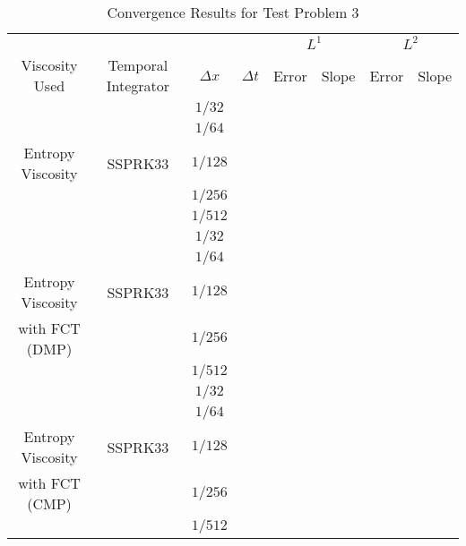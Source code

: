 \documentclass{report}
\begin{document}
\begin{table}[H]\caption{\label{prob3}Convergence Results for Test Problem 3}
\begin{center}
\begin{tabular}{c|c|c|c||c|c|c|c}\hline\hline
& & & & \multicolumn{2}{c}{$L^1$} & \multicolumn{2}{|c}{$L^2$}\\ \cline{5-8}
Viscosity Used         & Temporal Integrator & $\Delta x$ & $\Delta t$ & Error & Slope & Error & Slope \\ \hline\hline
                       &                     & $1/32$     &            &       &       &       &       \\
                       &                     & $1/64$     &            &       &       &       &       \\
Entropy Viscosity      & SSPRK33             & $1/128$    &            &       &       &       &       \\
                       &                     & $1/256$    &            &       &       &       &       \\
                       &                     & $1/512$    &            &       &       &       &       \\ \hline
                       &                     & $1/32$     &            &       &       &       &       \\
                       &                     & $1/64$     &            &       &       &       &       \\
Entropy Viscosity      & SSPRK33             & $1/128$    &            &       &       &       &       \\
with FCT (DMP)         &                     & $1/256$    &            &       &       &       &       \\
                       &                     & $1/512$    &            &       &       &       &       \\ \hline
                       &                     & $1/32$     &            &       &       &       &       \\
                       &                     & $1/64$     &            &       &       &       &       \\
Entropy Viscosity      & SSPRK33             & $1/128$    &            &       &       &       &       \\
with FCT (CMP)         &                     & $1/256$    &            &       &       &       &       \\
                       &                     & $1/512$    &            &       &       &       &       \\ \hline\hline
\end{tabular}
\end{center}
\end{table}
\end{document}
